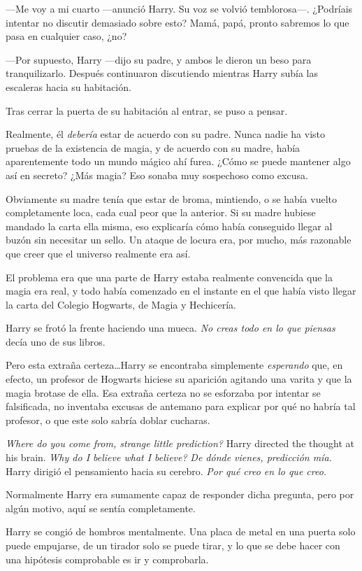 —Me voy a mi cuarto —anunció Harry. Su voz se volvió temblorosa—. ¿Podríais intentar no discutir demasiado sobre esto? Mamá, papá, pronto sabremos lo que pasa en cualquier caso, ¿no?

—Por supuesto, Harry —dijo su padre, y ambos le dieron un beso para tranquilizarlo. Después continuaron discutiendo mientras Harry subía las escaleras hacia su habitación.

Tras cerrar la puerta de su habitación al entrar, se puso a pensar.

Realmente, él \emph{debería} estar de acuerdo con su padre. Nunca nadie ha visto pruebas de la existencia de magia, y de acuerdo con su madre, había aparentemente todo un mundo mágico ahí furea. ¿Cómo se puede mantener algo así en secreto? ¿Más magia? Eso sonaba muy sospechoso como excusa.

Obviamente su madre tenía que estar de broma, mintiendo, o se había vuelto completamente loca, cada cual peor que la anterior. Si su madre hubiese mandado la carta ella misma, eso explicaría cómo había conseguido llegar al buzón sin necesitar un sello. Un ataque de locura era, por mucho, más razonable que creer que el universo realmente era así.

El problema era que una parte de Harry estaba realmente convencida que la magia era real, y todo había comenzado en el instante en el que había visto llegar la carta del Colegio Hogwarts, de Magia y Hechicería.

Harry se frotó la frente haciendo una mueca. \emph{No creas todo en lo que piensas} decía uno de sus libros.

Pero esta extraña certeza\dots Harry se encontraba simplemente \emph{esperando} que, en efecto, un profesor de Hogwarts hiciese su aparición agitando una varita y que la magia brotase de ella. Esa extraña certeza no se esforzaba por intentar se falsificada, no inventaba excusas de antemano para explicar por qué no habría tal profesor, o que este solo sabría doblar cucharas.

\emph{Where do you come from, strange little prediction?} Harry directed the thought at his brain. \emph{Why do I believe what I believe?}
\emph{De dónde vienes, predicción mía.} Harry dirigió el pensamiento hacia su cerebro. \emph{Por qué creo en lo que creo.}

Normalmente Harry era sumamente capaz de responder dicha pregunta, pero por algún motivo, aquí se sentía completamente.

Harry se congió de hombros mentalmente. Una placa de metal en una puerta solo puede empujarse, de un tirador solo se puede tirar, y lo que se debe hacer con una hipótesis comprobable es ir y comprobarla.

